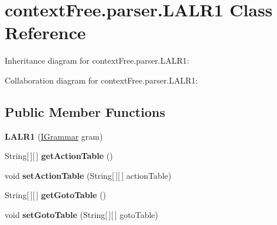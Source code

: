 \hypertarget{classcontext_free_1_1parser_1_1_l_a_l_r1}{\section{context\-Free.\-parser.\-L\-A\-L\-R1 Class Reference}
\label{classcontext_free_1_1parser_1_1_l_a_l_r1}
}


Inheritance diagram for context\-Free.\-parser.\-L\-A\-L\-R1\-:


Collaboration diagram for context\-Free.\-parser.\-L\-A\-L\-R1\-:
\subsection*{Public Member Functions}
\begin{DoxyCompactItemize}
\item 
\hypertarget{classcontext_free_1_1parser_1_1_l_a_l_r1_a38a0cedcd893b16f8207455f2287a7ad}{{\bfseries L\-A\-L\-R1} (\hyperlink{interfacecontext_free_1_1grammar_1_1_i_grammar}{I\-Grammar} gram)}\label{classcontext_free_1_1parser_1_1_l_a_l_r1_a38a0cedcd893b16f8207455f2287a7ad}

\item 
\hypertarget{classcontext_free_1_1parser_1_1_l_a_l_r1_a4dcd4a4ae0b77edc1dc8abffca59c80a}{String\mbox{[}$\,$\mbox{]}\mbox{[}$\,$\mbox{]} {\bfseries get\-Action\-Table} ()}\label{classcontext_free_1_1parser_1_1_l_a_l_r1_a4dcd4a4ae0b77edc1dc8abffca59c80a}

\item 
\hypertarget{classcontext_free_1_1parser_1_1_l_a_l_r1_a4bf6b83fddf359b6b0f6df26b1e58455}{void {\bfseries set\-Action\-Table} (String\mbox{[}$\,$\mbox{]}\mbox{[}$\,$\mbox{]} action\-Table)}\label{classcontext_free_1_1parser_1_1_l_a_l_r1_a4bf6b83fddf359b6b0f6df26b1e58455}

\item 
\hypertarget{classcontext_free_1_1parser_1_1_l_a_l_r1_af87607068fe2d41d8abbdb49fdeefcc0}{String\mbox{[}$\,$\mbox{]}\mbox{[}$\,$\mbox{]} {\bfseries get\-Goto\-Table} ()}\label{classcontext_free_1_1parser_1_1_l_a_l_r1_af87607068fe2d41d8abbdb49fdeefcc0}

\item 
\hypertarget{classcontext_free_1_1parser_1_1_l_a_l_r1_a002ce309af59de1951007a27d86b53b7}{void {\bfseries set\-Goto\-Table} (String\mbox{[}$\,$\mbox{]}\mbox{[}$\,$\mbox{]} goto\-Table)}\label{classcontext_free_1_1parser_1_1_l_a_l_r1_a002ce309af59de1951007a27d86b53b7}


\end{DoxyCompactItemize}
